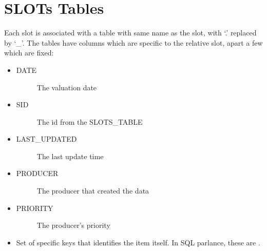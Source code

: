 \documentclass[letterpaper,10pt,english]{sphinxmanual}
\begin{document}
\section{SLOTs Tables}
\label{\detokenize{mrb:slots-tables}}
Each slot is associated with a table with same name as the slot, with ‘.’ replaced by ‘\_’.
The tables have columns which are specific to the relative slot, apart a few which are fixed:
\begin{itemize}
\item {} \begin{description}
\item[{DATE}] \leavevmode
The valuation date

\end{description}

\item {} \begin{description}
\item[{SID}] \leavevmode
The id from the SLOTS\_TABLE

\end{description}

\item {} \begin{description}
\item[{LAST\_UPDATED}] \leavevmode
The last update time

\end{description}

\item {} \begin{description}
\item[{PRODUCER}] \leavevmode
The producer that created the data

\end{description}

\item {} \begin{description}
\item[{PRIORITY}] \leavevmode
The producer’s priority

\end{description}

\item {} 
Set of specific keys that identifies the item itself. In SQL parlance, these are .

\end{itemize}
\end{document}
